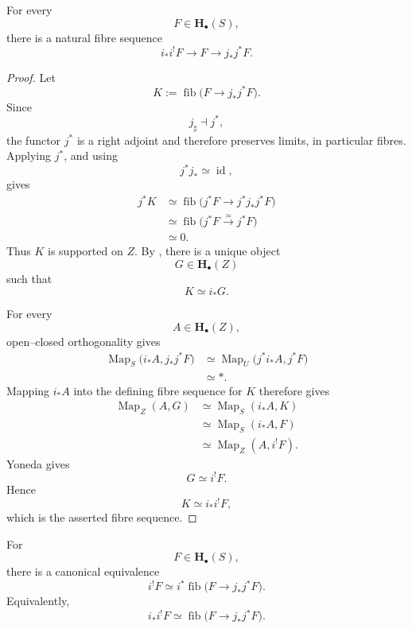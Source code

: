 \begin{theorem}
\label{thm:pointed-localization-fiber-sequence}
For every
\[
    F
    \in
    \mathbf H_\bullet(S),
\]
there is a natural fibre sequence
\[
    i_*i^!F
    \longrightarrow
    F
    \longrightarrow
    j_*j^*F.
\]
\end{theorem}

\begin{proof}
Let
\[
    K
    :=
    \operatorname{fib}
    \bigl(
        F
        \longrightarrow
        j_*j^*F
    \bigr).
\]
Since
\[
    j_\sharp
    \dashv
    j^*,
\]
the functor \(j^*\) is a right adjoint and therefore preserves limits,
in particular fibres.  Applying \(j^*\), and using
\[
    j^*j_*
    \simeq
    \operatorname{id},
\]
gives
\[
\begin{aligned}
    j^*K
    &\simeq
    \operatorname{fib}
    \bigl(
        j^*F
        \longrightarrow
        j^*j_*j^*F
    \bigr)
    \\
    &\simeq
    \operatorname{fib}
    \bigl(
        j^*F
        \xrightarrow{\simeq}
        j^*F
    \bigr)
    \\
    &\simeq
    0.
\end{aligned}
\]
Thus \(K\) is supported on \(Z\).  By
,
there is a unique object
\[
    G
    \in
    \mathbf H_\bullet(Z)
\]
such that
\[
    K
    \simeq
    i_*G.
\]

For every
\[
    A
    \in
    \mathbf H_\bullet(Z),
\]
open--closed orthogonality gives
\[
\begin{aligned}
    \operatorname{Map}_S
    \bigl(
        i_*A,
        j_*j^*F
    \bigr)
    &\simeq
    \operatorname{Map}_U
    \bigl(
        j^*i_*A,
        j^*F
    \bigr)
    \\
    &\simeq
    *.
\end{aligned}
\]
Mapping \(i_*A\) into the defining fibre sequence for \(K\) therefore
gives
\[
\begin{aligned}
    \operatorname{Map}_Z(A,G)
    &\simeq
    \operatorname{Map}_S(i_*A,K)
    \\
    &\simeq
    \operatorname{Map}_S(i_*A,F)
    \\
    &\simeq
    \operatorname{Map}_Z(A,i^!F).
\end{aligned}
\]
Yoneda gives
\[
    G
    \simeq
    i^!F.
\]
Hence
\[
    K
    \simeq
    i_*i^!F,
\]
which is the asserted fibre sequence.
\end{proof}

\begin{corollary}
\label{cor:closed-exceptional-pullback-formula}
For
\[
    F
    \in
    \mathbf H_\bullet(S),
\]
there is a canonical equivalence
\[
    i^!F
    \simeq
    i^*
    \operatorname{fib}
    \bigl(
        F
        \longrightarrow
        j_*j^*F
    \bigr).
\]
Equivalently,
\[
    i_*i^!F
    \simeq
    \operatorname{fib}
    \bigl(
        F
        \longrightarrow
        j_*j^*F
    \bigr).
\]
\end{corollary}

